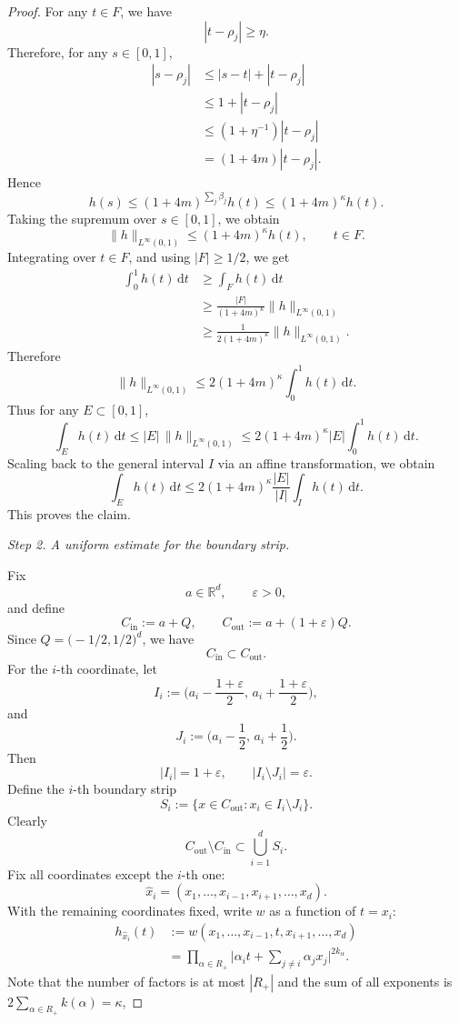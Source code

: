 \documentclass[10pt,a4paper]{amsart}
\begin{document}
\begin{proof}
For any $t\in F$, we have
\[
|t-\rho_j|\ge \eta.
\]
Therefore, for any $s\in[0,1]$,
\[
\begin{aligned}
|s-\rho_j| &\le |s-t|+|t-\rho_j| \\
&\le 1+|t-\rho_j| \\
&\le (1+\eta^{-1})|t-\rho_j| \\
&=(1+4m)|t-\rho_j|.
\end{aligned}
\]
Hence
\[
h(s)\le (1+4m)^{\sum_j\beta_j}h(t)\le (1+4m)^{\kappa}h(t).
\]
Taking the supremum over $s\in[0,1]$, we obtain
\[
\|h\|_{L^{\infty}(0,1)}\le (1+4m)^{\kappa}h(t),\qquad t\in F.
\]
Integrating over $t\in F$, and using $|F|\ge 1/2$, we get
\[
\begin{aligned}
\int_{0}^{1}h(t)\,\mathrm{d}t &\ge \int_{F}h(t)\,\mathrm{d}t \\
&\ge \frac{|F|}{(1+4m)^{\kappa}}\|h\|_{L^{\infty}(0,1)} \\
&\ge \frac{1}{2(1+4m)^{\kappa}}\|h\|_{L^{\infty}(0,1)}.
\end{aligned}
\]
Therefore
\[
\|h\|_{L^{\infty}(0,1)}\le 2(1+4m)^{\kappa}\int_{0}^{1}h(t)\,\mathrm{d}t.
\]
Thus for any $E\subset [0,1]$,
\[
\int_{E} h(t)\,\mathrm{d}t \le |E|\,\|h\|_{L^{\infty}(0,1)}
\le 2(1+4m)^{\kappa}|E|\int_{0}^{1} h(t)\,\mathrm{d}t.
\]
Scaling back to the general interval $I$ via an affine transformation, we obtain
\[
\int_{E} h(t)\,\mathrm{d}t \le 2(1+4m)^{\kappa}\frac{|E|}{|I|}\int_{I} h(t)\,\mathrm{d}t.
\]
This proves the claim.

\emph{Step 2. A uniform estimate for the boundary strip.}

Fix
\[
a\in\mathbb{R}^d,\qquad \varepsilon>0,
\]
and define
\[
C_{\mathrm{in}}:=a+Q,\qquad C_{\mathrm{out}}:=a+(1+\varepsilon)Q.
\]
Since $Q=\bigl(-1/2,1/2\bigr)^d$, we have
\begin{equation}\label{EPL05}
C_{\mathrm{in}}\subset C_{\mathrm{out}}.
\end{equation}
For the $i$-th coordinate, let
\[
I_i:=\biggl(a_i-\frac{1+\varepsilon}{2},\,a_i+\frac{1+\varepsilon}{2}\biggr),
\]
and
\[
J_i:=\biggl(a_i-\frac12,\,a_i+\frac12\biggr).
\]
Then
\[
|I_i|=1+\varepsilon,\qquad |I_i\setminus J_i|=\varepsilon.
\]
Define the $i$-th boundary strip
\[
S_i:=\{x\in C_{\mathrm{out}}: x_i\in I_i\setminus J_i\}.
\]
Clearly
\begin{equation}
C_{\mathrm{out}}\setminus C_{\mathrm{in}}\subset \bigcup_{i=1}^{d} S_i.
\end{equation}
Fix all coordinates except the $i$-th one:
\[
\widehat{x}_i = (x_1,\dots,x_{i-1},x_{i+1},\dots,x_d).
\]
With the remaining coordinates fixed, write $w$ as a function of $t=x_i$:
\[
\begin{aligned}
h_{\widehat{x}_i}(t) &:= w(x_1,\dots,x_{i-1},t,x_{i+1},\dots,x_d) \\
&= \prod_{\alpha\in R_+} \biggl| \alpha_i t + \sum_{j\neq i}\alpha_j x_j \biggr|^{2k_\alpha}.
\end{aligned}
\]
Note that the number of factors is at most $|R_+|$ and the sum of all exponents is $2\sum_{\alpha\in R_+} k(\alpha)=\kappa$,


\end{proof}
\end{document}
